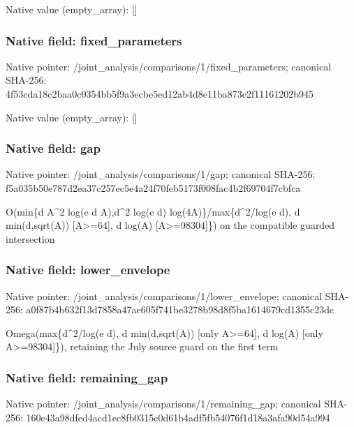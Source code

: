 \documentclass[10pt,a4paper]{article}
\begin{document}
Native value (empty\_\allowbreak{}array): []

\subsubsection{Native field: fixed\_\allowbreak{}parameters}
Native pointer: /joint\_\allowbreak{}analysis/comparisons/1/fixed\_\allowbreak{}parameters; canonical SHA-256: 4f53cda18c2baa0c0354bb5f9a3ecbe5ed12ab4d8e11ba873c2f11161202b945

Native value (empty\_\allowbreak{}array): []

\subsubsection{Native field: gap}
Native pointer: /joint\_\allowbreak{}analysis/comparisons/1/gap; canonical SHA-256: f5a035b50e787d2ea37c257ec5e4a24f70feb5173f008fac4b2f69704f7cbfca

\begingroup\raggedright\sloppy O(min\{d A\textasciicircum{}2 log(e d A),\allowbreak{}d\textasciicircum{}2 log(e d) log(4A)\}/\allowbreak{}max\{d\textasciicircum{}2/\allowbreak{}log(e d),\allowbreak{} d min(d,\allowbreak{}sqrt(A)) [A>=\allowbreak{}64],\allowbreak{} d log(A) [A>=\allowbreak{}98304]\}) on the compatible guarded intersection\par\endgroup

\subsubsection{Native field: lower\_\allowbreak{}envelope}
Native pointer: /joint\_\allowbreak{}analysis/comparisons/1/lower\_\allowbreak{}envelope; canonical SHA-256: a0f87b4b632f13d7858a47ae605f741be3278b98d8f5ba1614679cd1355c23dc

\begingroup\raggedright\sloppy Omega(max\{d\textasciicircum{}2/\allowbreak{}log(e d),\allowbreak{} d min(d,\allowbreak{}sqrt(A)) [only A>=\allowbreak{}64],\allowbreak{} d log(A) [only A>=\allowbreak{}98304]\}),\allowbreak{} retaining the July source guard on the first term\par\endgroup

\subsubsection{Native field: remaining\_\allowbreak{}gap}
Native pointer: /joint\_\allowbreak{}analysis/comparisons/1/remaining\_\allowbreak{}gap; canonical SHA-256: 160e43a98dfed4acd1ec8fb0315c0d61b4adf5fb54076f1d18a3afa90d54a994
\end{document}

